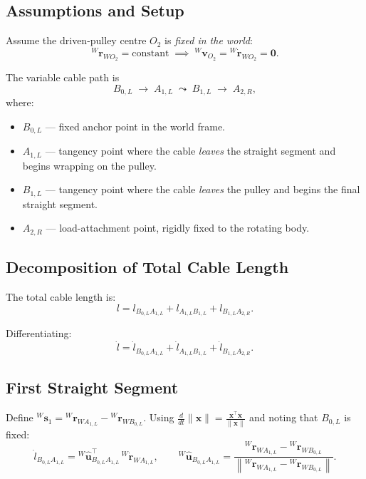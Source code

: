 \documentclass[12pt, a4paper]{article}
\theoremstyle{definition}
\begin{document}
\subsection{Assumptions and Setup}
\label{sec:cable_setup}

Assume the driven-pulley centre $O_2$ is \emph{fixed in the world}:
\begin{equation}
  {}^{W}\mathbf{r}_{WO_2} = \text{constant}
  \;\implies\;
  {}^{W}\mathbf{v}_{O_2} = {}^{W}\dot{\mathbf{r}}_{WO_2} = \mathbf{0}.
\end{equation}

The variable cable path is
\[
  B_{0,L} \;\to\; A_{1,L} \;\leadsto\; B_{1,L} \;\to\; A_{2,R},
\]
where:
\begin{itemize}
  \item $B_{0,L}$ --- fixed anchor point in the world frame.
  \item $A_{1,L}$ --- tangency point where the cable \emph{leaves} the straight
        segment and begins wrapping on the pulley.
  \item $B_{1,L}$ --- tangency point where the cable \emph{leaves} the pulley
        and begins the final straight segment.
  \item $A_{2,R}$ --- load-attachment point, rigidly fixed to the rotating body.
\end{itemize}

\subsection{Decomposition of Total Cable Length}
\label{sec:cable_decompose}

The total cable length is:
\begin{equation}
  l = l_{B_{0,L}A_{1,L}} + l_{A_{1,L}B_{1,L}} + l_{B_{1,L}A_{2,R}}.
\end{equation}

Differentiating:
\begin{equation}
  \dot{l}
  = \dot{l}_{B_{0,L}A_{1,L}}
  + \dot{l}_{A_{1,L}B_{1,L}}
  + \dot{l}_{B_{1,L}A_{2,R}}.
\end{equation}

\subsection{First Straight Segment}
\label{sec:seg1}

Define ${}^{W}\mathbf{s}_1 = {}^{W}\mathbf{r}_{WA_{1,L}} - {}^{W}\mathbf{r}_{WB_{0,L}}$.
Using $\frac{d}{dt}\|\mathbf{x}\| = \frac{\mathbf{x}^\top\dot{\mathbf{x}}}{\|\mathbf{x}\|}$
and noting that $B_{0,L}$ is fixed:
\begin{equation}
  \dot{l}_{B_{0,L}A_{1,L}}
  = {}^{W}\hat{\mathbf{u}}_{B_{0,L}A_{1,L}}^\top\,{}^{W}\dot{\mathbf{r}}_{WA_{1,L}},
  \qquad
  {}^{W}\hat{\mathbf{u}}_{B_{0,L}A_{1,L}}
  = \frac{{}^{W}\mathbf{r}_{WA_{1,L}} - {}^{W}\mathbf{r}_{WB_{0,L}}}
         {\left\|{}^{W}\mathbf{r}_{WA_{1,L}} - {}^{W}\mathbf{r}_{WB_{0,L}}\right\|}.
\end{equation}
\end{document}
